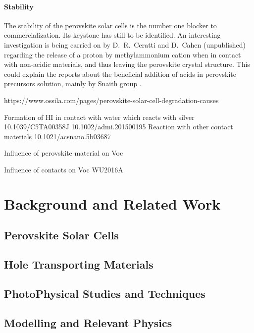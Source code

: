 	\paragraph{Stability}
	The stability of the perovskite solar cells is the number one blocker to commercialization.
	Its keystone has still to be identified.
	An interesting investigation is being carried on by D.\ R.\ Ceratti and D.\ Cahen (unpublished) regarding the release of a proton by methylammonium cation when in contact with non-acidic materials, and thus leaving the perovskite crystal structure.
	This could explain the reports about the beneficial addition of acids in perovskite precursors solution, mainly by Snaith group \cite{Noel2017,Zhang2015a,Nayak2016}.


	https://www.ossila.com/pages/perovskite-solar-cell-degradation-causes


Formation of HI in contact with water which reacts with silver 10.1039/C5TA00358J 10.1002/admi.201500195
Reaction with other contact materials 10.1021/acsnano.5b03687

	Influence of perovskite material on Voc \cite{Wheeler2017,Eperon2014,Noh2013a}

	Influence of contacts on Voc \cite{CorreaBaena2015} WU2016A

\section{Background and Related Work}\label{sec:background}

	\subsection{Perovskite Solar Cells}

	\subsection{Hole Transporting Materials}

	\subsection{PhotoPhysical Studies and Techniques}

	\subsection{Modelling and Relevant Physics}


